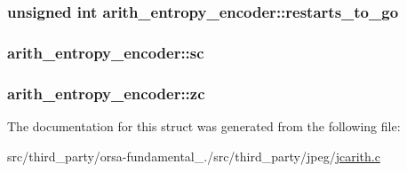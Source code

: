 \subsubsection[{restarts\+\_\+to\+\_\+go}]{\setlength{\rightskip}{0pt plus 5cm}unsigned int arith\+\_\+entropy\+\_\+encoder\+::restarts\+\_\+to\+\_\+go}\label{structarith__entropy__encoder_add27b20b9b70a05f49c4242844253109}
\hypertarget{structarith__entropy__encoder_aabd22ab89a4d488c9eebb109d91c3655}{}
\subsubsection[{sc}]{ arith\+\_\+entropy\+\_\+encoder\+::sc}\label{structarith__entropy__encoder_aabd22ab89a4d488c9eebb109d91c3655}
\hypertarget{structarith__entropy__encoder_ad02520a5282d4d042bf39e8a50d6ddf8}{}
\subsubsection[{zc}]{ arith\+\_\+entropy\+\_\+encoder\+::zc}\label{structarith__entropy__encoder_ad02520a5282d4d042bf39e8a50d6ddf8}


The documentation for this struct was generated from the following file\+:\begin{DoxyCompactItemize}
\item 
src/third\+\_\+party/orsa-\/fundamental\+\_./src/third\+\_\+party/jpeg/\hyperlink{jcarith_8c}{jcarith.\+c}\end{DoxyCompactItemize}
